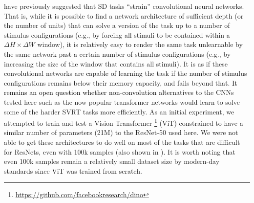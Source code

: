 \citet{kim2018not} have previously suggested that SD tasks ``strain'' convolutional neural networks. That is, while it is possible to find a network architecture of sufficient depth (or the number of units) that can solve a version of the task up to a number of stimulus configurations (e.g., by forcing all stimuli to be contained within a $\Delta H \times \Delta W$ window), it is relatively easy to render the same task unlearnable by the same network \textcolor{black}{past} a certain number of stimulus configurations (e.g., by increasing the size of the window that contains all stimuli). It is as if these convolutional networks are \textcolor{black}{capable of learning} the task if the number of stimulus configurations remains below their memory capacity, and fails beyond that. \textcolor{black}{It remains an open question  whether non-convolution} alternatives to the CNNs tested here such as the now popular transformer networks  \citep{Dosovitskiy2020-iq,touvron2021training,tolstikhin2021mlp} would learn to solve some of the harder SVRT tasks more efficiently. As an initial experiment, we attempted to train and test a Vision Transformer \footnote[1]{\url{https://github.com/facebookresearch/dino}} (ViT) \citep{Dosovitskiy2020-iq}  constrained to have a similar number of parameters (21M) to the ResNet-50 used here. We were not able to get these architectures to do well on most of the tasks that are difficult for ResNets, even with 100k samples (also shown in \citet{messina2021recurrent}). It is worth noting that even 100k samples remain a relatively small dataset size by modern-day standards since ViT was trained from scratch.

